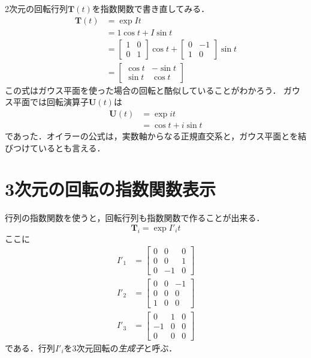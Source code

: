 \documentclass{jsbook}
\newcommand{\keyword}[1]{\emph{#1}}
\newcommand{\bop}[1]{\boldsymbol{#1}}
\newcommand{\im}{i}%
\begin{document}
2次元の回転行列$\bop{T}(t)$を指数関数で書き直してみる．
\begin{align}
\bop{T}(t)&=\exp It\\
  &=1\cos t+I\sin t\\
  &=\begin{bmatrix}1&0\\0&1\end{bmatrix}\cos t+\begin{bmatrix}0&-1\\1&0\end{bmatrix}\sin t\\
  &=\begin{bmatrix}\cos t&-\sin t\\\sin t&\cos t\end{bmatrix}
\end{align}
この式はガウス平面を使った場合の回転と酷似していることがわかろう．
ガウス平面では回転演算子$\bop{U}(t)$は
\begin{align}
\bop{U}(t)&=\exp \im t\\
  &=\cos t+\im\sin t
\end{align}
であった．オイラーの公式は，実数軸からなる正規直交系と，ガウス平面とを結びつけているとも言える．



\section{3次元の回転の指数関数表示}

行列の指数関数を使うと，回転行列も指数関数で作ることが出来る．
\begin{equation}
\bop{T}_i=\exp I'_it
\end{equation}
ここに
\begin{align}
I'_1&=\begin{bmatrix}0&0&0\\0&0&1\\0&-1&0\end{bmatrix}\\
I'_2&=\begin{bmatrix}0&0&-1\\0&0&0\\1&0&0\end{bmatrix}\\
I'_3&=\begin{bmatrix}0&1&0\\-1&0&0\\0&0&0\end{bmatrix}
\end{align}
である．行列$I'_i$を3次元回転の\keyword{生成子}と呼ぶ．
\end{document}
